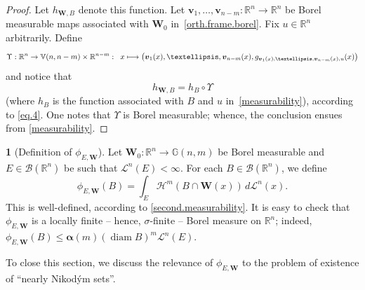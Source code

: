 \documentclass[11pt]{article}
\newcounter{cdrthm}[section]
\theoremstyle{definition}
\theoremstyle{jepanonymous}
\newtheorem{jepempty}[cdrthm]{}
\newenvironment{enonce}[2][remark]{\begin{jepempty}[#2]}{\end{jepempty}}
\theoremstyle{plain}
\newcommand\mto{\mathchoice{\longmapsto}{\mapsto}{\mapsto}{\mapsto}}
\newenvironment{Empty}[2][\null]{%
\begin{enonce}[remark]{#1}#2}
{\end{enonce}}
\newcommand{\R}{\mathbb{R}}
\newcommand{\Rn}{\R^n}
\newcommand{\calB}{\mathscr{B}}
\newcommand{\calH}{\mathscr{H}}
\newcommand{\calL}{\mathscr{L}}
\newcommand{\balpha}{\boldsymbol{\alpha}}
\newcommand{\bW}{{\boldsymbol{W}}}
\newcommand{\bv}{{\boldsymbol{v}}}
\newcommand{\bV}{\mathbb{V}}
\newcommand{\bG}{\mathbb{G}}
\DeclareMathOperator{\rmdiam}{\mathrm{diam}}
\begin{document}
\begin{proof}
Let $h_{\bW,B}$ denote this function.
Let $\bv_1,\ldots,\bv_{n-m}: \Rn \to \Rn$ be Borel measurable maps associated with $\bW_0$ in~\ref{orth.frame.borel}.
Fix $u \in \Rn$ arbitrarily.
Define
\begin{equation*}
\Upsilon: \Rn \to \bV(n,n-m) \times \R^{n-m}:\;\; x \mto \left(\bv_1(x),\ldots,\bv_{n-m}(x),g_{\bv_1(x),\ldots,\bv_{n-m}(x),u}(x) \right)
\end{equation*}
and notice that
\begin{equation*}
h_{\bW,B} = h_{B} \circ \Upsilon
\end{equation*}
(where $h_{B}$ is the function associated with $B$ and $u$ in~\ref{measurability}), according to \eqref{eq.4}.
One notes that $\Upsilon$ is Borel measurable; whence, the conclusion ensues from \ref{measurability}.
\end{proof}

\begin{Empty}[Definition of $\phi_{E,\bW}$]
\label{def.phi}
Let $\bW_0: \Rn \to \bG(n,m)$ be Borel measurable and $E \in \calB(\Rn)$ be such that $\calL^n(E) < \infty$.
For each $B \in \calB(\Rn)$, we define
\begin{equation*}
\phi_{E,\bW}(B) = \int_E \calH^m(B \cap \bW(x)) \,d\calL^n(x).
\end{equation*}
This is well-defined, according to \ref{second.measurability}.
It is easy to check that $\phi_{E,\bW}$ is a locally finite -- hence, $\sigma$-finite -- Borel measure on $\Rn$; indeed, $\phi_{E,\bW}(B) \leq \balpha(m) (\rmdiam B)^m \calL^n(E)$.
\par
To close this section, we discuss the relevance of $\phi_{E,\bW}$ to the problem of existence of ``nearly Nikod\'ym sets''.
\end{Empty}
\end{document}
